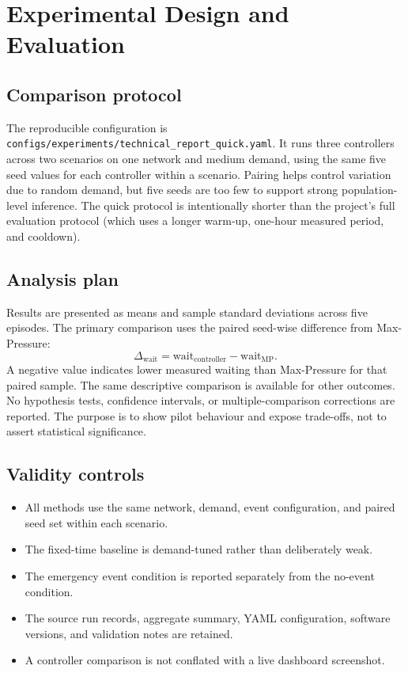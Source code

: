 \documentclass[11pt,a4paper]{article}
\begin{document}
\section{Experimental Design and Evaluation}
\subsection{Comparison protocol}
The reproducible configuration is \texttt{configs/experiments/technical\_report\_quick.yaml}.
It runs three controllers across two scenarios on one network and medium demand,
using the same five seed values for each controller within a scenario. Pairing helps
control variation due to random demand, but five seeds are too few to support strong
population-level inference. The quick protocol is intentionally shorter than the
project's full evaluation protocol (which uses a longer warm-up, one-hour measured
period, and cooldown).

\subsection{Analysis plan}
Results are presented as means and sample standard deviations across five episodes.
The primary comparison uses the paired seed-wise difference from Max-Pressure:
\[
\Delta_{\mathrm{wait}} =
\mathrm{wait}_{\mathrm{controller}} -
\mathrm{wait}_{\mathrm{MP}}.
\]
A negative value indicates lower measured waiting than Max-Pressure for that paired
sample. The same descriptive comparison is available for other outcomes. No
hypothesis tests, confidence intervals, or multiple-comparison corrections are
reported. The purpose is to show pilot behaviour and expose trade-offs, not to assert
statistical significance.

\subsection{Validity controls}
\begin{itemize}
  \item All methods use the same network, demand, event configuration, and paired seed
  set within each scenario.
  \item The fixed-time baseline is demand-tuned rather than deliberately weak.
  \item The emergency event condition is reported separately from the no-event
  condition.
  \item The source run records, aggregate summary, YAML configuration, software
  versions, and validation notes are retained.
  \item A controller comparison is not conflated with a live dashboard screenshot.
\end{itemize}
\end{document}
